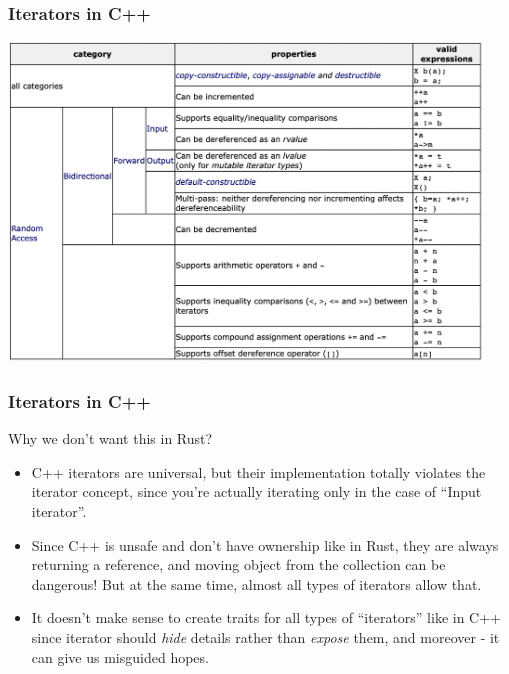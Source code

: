 \documentclass[aspectratio=1610,t]{beamer}
\begin{document}

\begin{frame}[fragile,c]
\frametitle{Iterators in C++}
\begin{center}
    \includegraphics[height=8.5cm,keepaspectratio]{images/cpp-iters.png}
\end{center}
\end{frame}


\begin{frame}[fragile]
\frametitle{Iterators in C++}
Why we don't want this in Rust?

\begin{itemize}
    \item<1-> C++ iterators are universal, but their implementation totally violates the iterator concept, since you're actually iterating only in the case of ``Input iterator''.
    \item<2-> Since C++ is unsafe and don't have ownership like in Rust, they are always returning a reference, and moving object from the collection can be dangerous! But at the same time, almost all types of iterators allow that.
    \item<3-> It doesn't make sense to create traits for all types of ``iterators'' like in C++ since iterator should \textit{hide} details rather than \textit{expose} them, and moreover - it can give us misguided hopes.
\end{itemize}
\end{frame}

\end{document}
